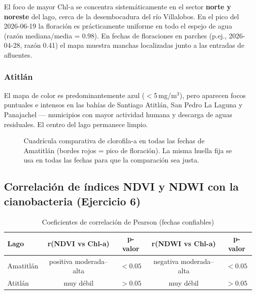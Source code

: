 \documentclass[12pt, a4paper]{article}
\newcommand{\mgm}{\,mg/m$^3$}
\begin{document}
El foco de mayor Chl-a se concentra sistemáticamente en el sector \textbf{norte y noreste}
del lago, cerca de la desembocadura del río Villalobos. En el pico del 2026-06-19 la
floración es prácticamente uniforme en todo el espejo de agua (razón mediana/media = 0.98).
En fechas de floraciones en parches (p.ej., 2026-04-28, razón 0.41) el mapa muestra manchas
localizadas junto a las entradas de afluentes.

\subsubsection{Atitlán}

El mapa de color es predominantemente azul ($<$5\mgm), pero aparecen focos puntuales e
intensos en las bahías de Santiago Atitlán, San Pedro La Laguna y Panajachel — municipios
con mayor actividad humana y descarga de aguas residuales. El centro del lago permanece limpio.

\begin{figure}[H]
  \centering
  \caption{Cuadrícula comparativa de clorofila-a en todas las fechas de Amatitlán (bordes rojos = pico de floración). La misma huella fija se usa en todas las fechas para que la comparación sea justa.}
  \label{fig:grid_amatitlan}
\end{figure}

\subsection{Correlación de índices NDVI y NDWI con la cianobacteria (Ejercicio 6)}

\begin{table}[H]
\centering
\caption{Coeficientes de correlación de Pearson (fechas confiables)}
\begin{tabular}{lcccc}
\toprule
\textbf{Lago} & \textbf{r(NDVI vs Chl-a)} & \textbf{p-valor} & \textbf{r(NDWI vs Chl-a)} & \textbf{p-valor} \\
\midrule
Amatitlán & positiva moderada–alta & $< 0.05$ & negativa moderada–alta & $< 0.05$ \\
Atitlán   & muy débil              & $> 0.05$ & muy débil              & $> 0.05$ \\
\bottomrule
\end{tabular}
\end{table}
\end{document}
